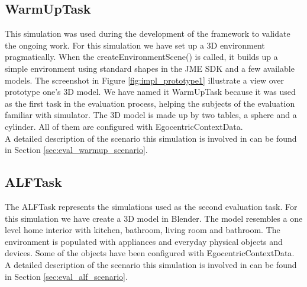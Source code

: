 \subsection{WarmUpTask} %
\label{subsec:impl_warmup_task}
This simulation was used during the development of the framework to validate the ongoing work. For this simulation we have set up a 3D environment pragmatically. When the createEnvironmentScene() is called, it builds up a simple environment using standard shapes in the JME SDK and a few available models. The screenshot in Figure \ref{fig:impl_prototype1} illustrate a view over prototype one's 3D model. We have named it WarmUpTask because it was used as the first task in the evaluation process, helping the subjects of the evaluation familiar with simulator. The 3D model is made up by two tables, a sphere and a cylinder. All of them are configured with EgocentricContextData.\\

A detailed description of the scenario this simulation is involved in can be found in Section \ref{sec:eval_warmup_scenario}.

\subsection{ALFTask} %
\label{subsec:impl_alf_task}
The ALFTask represents the simulations used as the second evaluation task. For this simulation we have create a 3D model in Blender. The model resembles a one level home interior with kitchen, bathroom, living room and bathroom. The environment is populated with appliances and everyday physical objects and devices. Some of the objects have been configured with EgocentricContextData. A detailed description of the scenario this simulation is involved in can be found in Section \ref{sec:eval_alf_scenario}.\\

